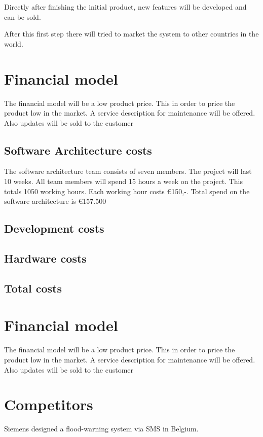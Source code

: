 Directly after finishing the initial product, new features will be developed and can be sold.

After this first step there will tried to market the system to other countries in the world. 


\section{Financial model}
The financial model will be a low product price. This in order to price the product low in the market. A service description for maintenance will be offered. Also updates will be sold to the customer

\subsection{Software Architecture costs}
The software architecture team consists of seven members. The project will last 10 weeks. All team members will spend 15 hours a week on the project. This totals 1050 working hours. Each working hour costs €150,-. Total spend on the software architecture is €157.500
\subsection{Development costs}

\subsection{Hardware costs}

\subsection{Total costs}


\section{Financial model}
The financial model will be a low product price. This in order to price the product low in the market. A service description for maintenance will be offered. Also updates will be sold to the customer

\section{Competitors}
Siemens designed a flood-warning system via SMS in Belgium.

